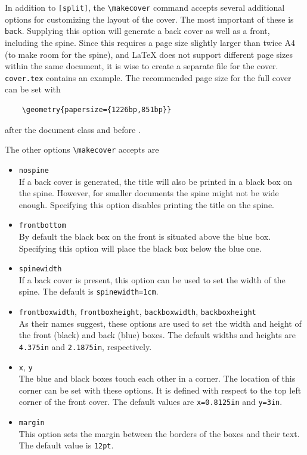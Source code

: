 In addition to \texttt{[split]}, the \verb|\makecover| command accepts several additional options for customizing the layout of the cover.
The most important of these is \texttt{back}. Supplying this option will generate a back cover as well as a front, including the spine. Since this requires a page size slightly larger than twice A4 (to make room for the spine), and \LaTeX{} does not support different page sizes within the same document, it is wise to create a separate file for the cover. \texttt{cover.tex} contains an example. The recommended page size for the full cover can be set with
\begin{verbatim}
    \geometry{papersize={1226bp,851bp}}
\end{verbatim}
after the document class and before \verb||.

The other options \verb|\makecover| accepts are
\begin{itemize}
    \item\texttt{nospine} \\
    If a back cover is generated, the title will also be printed in a black box on the spine. However, for smaller documents the spine might not be wide enough. Specifying this option disables printing the title on the spine.
    \item\texttt{frontbottom} \\
    By default the black box on the front is situated above the blue box. Specifying this option will place the black box below the blue one.
    \item\texttt{spinewidth} \\
    If a back cover is present, this option can be used to set the width of the spine. The default is \texttt{spinewidth=1cm}.
    \item\texttt{frontboxwidth}, \texttt{frontboxheight}, \texttt{backboxwidth}, \texttt{backboxheight} \\
    As their names suggest, these options are used to set the width and height of the front (black) and back (blue) boxes. The default widths and heights are \texttt{4.375in} and \texttt{2.1875in}, respectively.
    \item\texttt{x}, \texttt{y} \\
    The blue and black boxes touch each other in a corner. The location of this corner can be set with these options. It is defined with respect to the top left corner of the front cover. The default values are \texttt{x=0.8125in} and \texttt{y=3in}.
    \item\texttt{margin} \\
    This option sets the margin between the borders of the boxes and their text. The default value is \texttt{12pt}.
\end{itemize}

